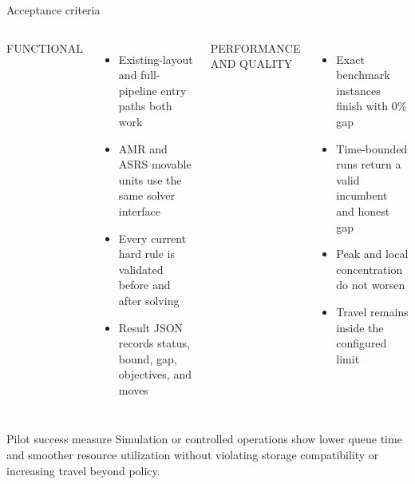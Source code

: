 \documentclass[aspectratio=169,10pt]{beamer}
\newcommand{\smallcaps}[1]{\textcolor{Slate}{\scriptsize\MakeUppercase{#1}}}
\begin{document}
\begin{frame}{Acceptance criteria}
  \begin{columns}[T,onlytextwidth]
      \smallcaps{Functional}
      \begin{itemize}
        \item Existing-layout and full-pipeline entry paths both work
        \item AMR and ASRS movable units use the same solver interface
        \item Every current hard rule is validated before and after solving
        \item Result JSON records status, bound, gap, objectives, and moves
      \end{itemize}

      \smallcaps{Performance and quality}
      \begin{itemize}
        \item Exact benchmark instances finish with \(0\%\) gap
        \item Time-bounded runs return a valid incumbent and honest gap
        \item Peak and local concentration do not worsen
        \item Travel remains inside the configured limit
      \end{itemize}
  \end{columns}

  \vspace{0.45cm}
  \begin{block}{Pilot success measure}
    Simulation or controlled operations show lower queue time and smoother
    resource utilization without violating storage compatibility or increasing
    travel beyond policy.
  \end{block}
\end{frame}
\end{document}
